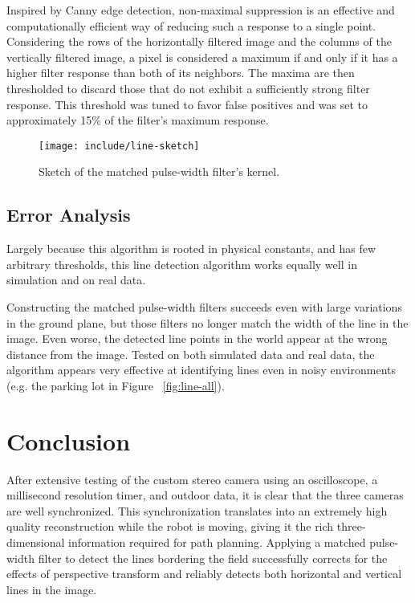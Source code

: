 \documentclass[twocolumn,11pt]{article}
\begin{document}
Inspired by Canny edge detection, non-maximal suppression is an effective and
computationally efficient way of reducing such a response to a single point.
Considering the rows of the horizontally filtered image and the columns of the
vertically filtered image, a pixel is considered a maximum if and only if it
has a higher filter response than both of its neighbors. The maxima are then
thresholded to discard those that do not exhibit a sufficiently strong filter
response. This threshold was tuned to favor false positives and was set to
approximately 15\% of the filter's maximum response.

\begin{figure}
	\centering
	\texttt{[image: include/line-sketch]}
	\caption{Sketch of the matched pulse-width filter's kernel.}
	\label{fig:line-sketch}
\end{figure}

\subsection{Error Analysis}
\label{sec:line-error}

Largely because this algorithm is rooted in physical constants, and has few
arbitrary thresholds, this line detection algorithm works equally well in
simulation and on real data. 

Constructing the matched pulse-width filters succeeds even with large
variations in the ground plane, but those filters no longer match the width of
the line in the image.  Even worse, the detected line points in the world
appear at the wrong distance from the image. Tested on both simulated data and
real data, the algorithm appears very effective at identifying lines even in
noisy environments (e.g. the parking lot in Figure ~\ref{fig:line-all}).

\section{Conclusion}
\label{sec:conclusion}
After extensive testing of the custom stereo camera using an oscilloscope, a
millisecond resolution timer, and outdoor data, it is clear that the three
cameras are well synchronized. This synchronization translates into an
extremely high quality reconstruction while the robot is moving, giving it the
rich three-dimensional information required for path planning. Applying a
matched pulse-width filter to detect the lines bordering the field successfully
corrects for the effects of perspective transform and reliably detects both
horizontal and vertical lines in the image.
\end{document}
